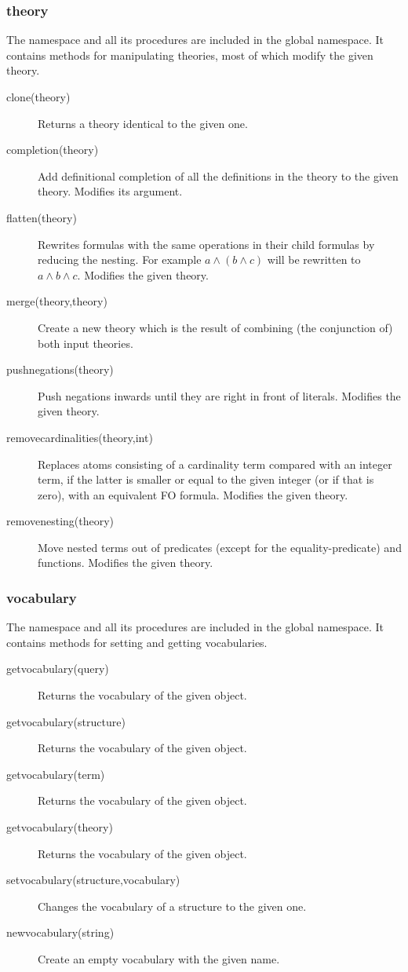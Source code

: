 \subsubsection{theory}
The  namespace and all its procedures are included in the global namespace. It contains methods for manipulating theories, most of which modify the given theory.
\begin{description}
	\item[clone(theory)]
		Returns a theory identical to the given one.
	\item[completion(theory)]
		Add definitional completion of all the definitions in the theory to the given theory. Modifies its argument.
	\item[flatten(theory)]
		Rewrites formulas with the same operations in their child formulas by reducing the nesting. For example $a \wedge (b\wedge c)$ will be rewritten to $a\wedge b \wedge c$.
		Modifies the given theory. 
	\item[merge(theory,theory)]
 		Create a new theory which is the result of combining (the conjunction of) both input theories.
	\item[pushnegations(theory)]
 		Push negations inwards until they are right in front of literals.
 		Modifies the given theory.
	\item[removecardinalities(theory,int)]
		Replaces atoms consisting of a cardinality term compared with an integer term, if the latter is smaller or equal to the given integer (or if that is zero), with an equivalent FO formula.
 		Modifies the given theory.
	\item[removenesting(theory)]
 		Move nested terms out of predicates (except for the equality-predicate) and functions.
 		Modifies the given theory.
\end{description}

\subsubsection{vocabulary}
The  namespace and all its procedures are included in the global namespace. It contains methods for setting and getting vocabularies.
\begin{description}
	\item[getvocabulary(query)]
		Returns the vocabulary of the given object.
	\item[getvocabulary(structure)]
		Returns the vocabulary of the given object.
	\item[getvocabulary(term)]
		Returns the vocabulary of the given object.
	\item[getvocabulary(theory)]
		Returns the vocabulary of the given object.
	\item[setvocabulary(structure,vocabulary)]
		Changes the vocabulary of a structure to the given one.
	\item[newvocabulary(string)]
 		Create an empty vocabulary with the given name.

\end{description}


